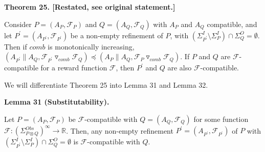 \documentclass[10pt,a4paper]{article}
\begin{document}
 
\par\medskip\noindent\textbf{Theorem 25. [Restated, see original statement.]}\par
 
 
Consider $P=(A_{P},\mathcal{F}_{P})$ and $Q=(A_{Q},\mathcal{F}_{Q})$ with $A_{P}$ and $A_{Q}$ compatible, and let $P^{\prime}=(A_{P^{\prime}},\mathcal{F}_{P^{\prime}})$ be a non-empty refinement of $P$, with $(\Sigma_{P^{\prime}}^{I}\setminus\Sigma_{P}^{I})\cap\Sigma_{Q}^{O}=\emptyset$. Then if $\mathit{comb}$ is monotonically increasing, $(A_{P^{\prime}}\parallel A_{Q},{{\mathcal{F}_{P^{\prime}}}\mathbin{\triangledown_{\mathit{comb}}}{\mathcal{F}_{Q}}})\preceq(A_{P}\parallel A_{Q},{{\mathcal{F}_{P}}\mathbin{\triangledown_{\mathit{comb}}}{\mathcal{F}_{Q}}})$. If $P$ and $Q$ are $\mathcal{F}$-compatible for a reward function $\mathcal{F}$, then $P^{\prime}$ and $Q$ are also $\mathcal{F}$-compatible.\par
 
 
 
 
 
We will differentiate Theorem 25 into Lemma 31 and Lemma 32.\par
 
 
 
\par\medskip\noindent\textbf{Lemma 31 (Substitutability).}\par
 
 
Let $P=(A_{P},\mathcal{F}_{P})$ be $\mathcal{F}$-compatible with $Q=(A_{Q},\mathcal{F}_{Q})$ for some function $\mathcal{F}:(\Sigma_{P\otimes Q}^{Obs})^{\infty}\to\mathbb{R}$. Then, any non-empty refinement $P^{\prime}=(A_{P^{\prime}},\mathcal{F}_{P^{\prime}})$ of $P$ with $(\Sigma_{P^{\prime}}^{I}\setminus\Sigma_{P}^{I})\cap\Sigma_{Q}^{O}=\emptyset$ is $\mathcal{F}$-compatible with $Q$.\par
 
 
 
 
 
\end{document}
